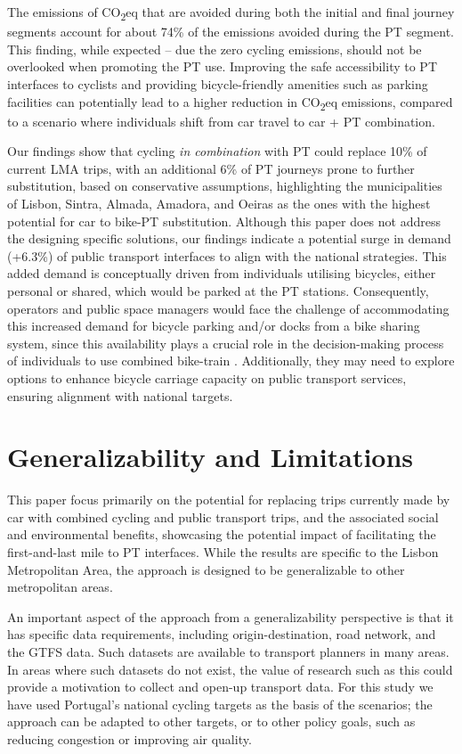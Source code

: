 \documentclass[review, doubleblind, 3p,
authoryear]{elsarticle} %
\begin{document}
The emissions of CO\textsubscript{2}eq that are avoided during both the
initial and final journey segments account for about 74\% of the
emissions avoided during the PT segment. This finding, while expected --
due the zero cycling emissions, should not be overlooked when promoting
the PT use. Improving the safe accessibility to PT interfaces to
cyclists and providing bicycle-friendly amenities such as parking
facilities can potentially lead to a higher reduction in
CO\textsubscript{2}eq emissions, compared to a scenario where
individuals shift from car travel to car + PT combination.

Our findings show that cycling \emph{in combination} with PT could
replace 10\% of current LMA trips, with an additional 6\% of PT journeys
prone to further substitution, based on conservative assumptions,
highlighting the municipalities of Lisbon, Sintra, Almada, Amadora, and
Oeiras as the ones with the highest potential for car to bike-PT
substitution. Although this paper does not address the designing
specific solutions, our findings indicate a potential surge in demand
(+6.3\%) of public transport interfaces to align with the national
strategies. This added demand is conceptually driven from individuals
utilising bicycles, either personal or shared, which would be parked at
the PT stations. Consequently, operators and public space managers would
face the challenge of accommodating this increased demand for bicycle
parking and/or docks from a bike sharing system, since this availability
plays a crucial role in the decision-making process of individuals to
use combined bike-train \citep{jonkeren2021bicycle}. Additionally, they
may need to explore options to enhance bicycle carriage capacity on
public transport services, ensuring alignment with national targets.

\section{Generalizability and
Limitations}\label{generalizability-and-limitations}

This paper focus primarily on the potential for replacing trips
currently made by car with combined cycling and public transport trips,
and the associated social and environmental benefits, showcasing the
potential impact of facilitating the first-and-last mile to PT
interfaces. While the results are specific to the Lisbon Metropolitan
Area, the approach is designed to be generalizable to other metropolitan
areas.

An important aspect of the approach from a generalizability perspective
is that it has specific data requirements, including origin-destination,
road network, and the GTFS data. Such datasets are available to
transport planners in many areas. In areas where such datasets do not
exist, the value of research such as this could provide a motivation to
collect and open-up transport data. For this study we have used
Portugal's national cycling targets as the basis of the scenarios; the
approach can be adapted to other targets, or to other policy goals, such
as reducing congestion or improving air quality.
\end{document}
